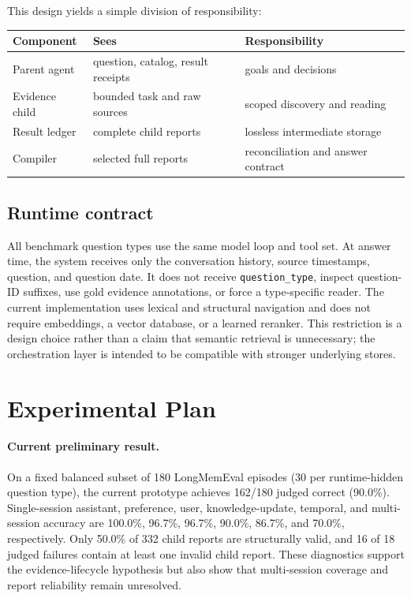\documentclass{article}
\begin{document}
This design yields a simple division of responsibility:
\begin{center}
\begin{tabular}{lll}
\toprule
Component & Sees & Responsibility \\
\midrule
Parent agent & question, catalog, result receipts & goals and decisions \\
Evidence child & bounded task and raw sources & scoped discovery and reading \\
Result ledger & complete child reports & lossless intermediate storage \\
Compiler & selected full reports & reconciliation and answer contract \\
\bottomrule
\end{tabular}
\end{center}

\subsection{Runtime contract}

All benchmark question types use the same model loop and tool set. At answer
time, the system receives only the conversation history, source timestamps,
question, and question date. It does not receive \texttt{question\_type}, inspect
question-ID suffixes, use gold evidence annotations, or force a type-specific
reader. The current implementation uses lexical and structural navigation and
does not require embeddings, a vector database, or a learned reranker. This
restriction is a design choice rather than a claim that semantic retrieval is
unnecessary; the orchestration layer is intended to be compatible with stronger
underlying stores.

\section{Experimental Plan}

\paragraph{Current preliminary result.}
On a fixed balanced subset of 180 LongMemEval episodes (30 per runtime-hidden
question type), the current prototype achieves 162/180 judged correct (90.0\%).
Single-session assistant, preference, user, knowledge-update, temporal, and
multi-session accuracy are 100.0\%, 96.7\%, 96.7\%, 90.0\%, 86.7\%, and 70.0\%,
respectively. Only 50.0\% of 332 child reports are structurally valid, and 16 of
18 judged failures contain at least one invalid child report. These diagnostics
support the evidence-lifecycle hypothesis but also show that multi-session
coverage and report reliability remain unresolved.
\end{document}
